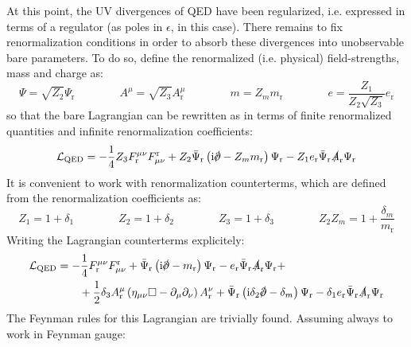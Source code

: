 At this point, the UV divergences of QED have been regularized, i.e. expressed in terms of a regulator (as poles in $ \epsilon $, in this case). There remains to fix renormalization conditions in order to absorb these divergences into unobservable bare parameters.
To do so, define the renormalized (i.e. physical) field-strengths, mass and charge as:
\begin{equation}
  \Psi = \sqrt{Z_2} \Psi_\text{r}
  \qquad \qquad
  A^\mu = \sqrt{Z_3} A^\mu_\text{r}
  \qquad \qquad
  m = Z_m m_\text{r}
  \qquad \qquad
  e = \frac{Z_1}{Z_2 \sqrt{Z_3}} e_\text{r}
  \label{eq:qed-renormalization}
\end{equation}
so that the bare Lagrangian  can be rewritten as in terms of finite renormalized quantities and infinite renormalization coefficients:
\begin{equation}
  \lag_\text{QED} = - \frac{1}{4} Z_3 F^{\mu \nu}_\text{r} F^\text{r}_{\mu \nu} + Z_2 \bar{\Psi}_\text{r} \left( \img \slashed{\pa} - Z_m m_\text{r} \right) \Psi_\text{r} - Z_1 e_\text{r} \bar{\Psi}_\text{r} \slashed{A}_\text{r} \Psi_\text{r}
\end{equation}
It is convenient to work with renormalization counterterms, which are defined from the renormalization coefficients as:
\begin{equation}
  Z_1 = 1 + \delta_1
  \qquad \qquad
  Z_2 = 1 + \delta_2
  \qquad \qquad
  Z_3 = 1 + \delta_3
  \qquad \qquad
  Z_2 Z_m = 1 + \frac{\delta_m}{m_\text{r}}
  \label{eq:qed-counterterms}
\end{equation}
Writing the Lagrangian counterterms explicitely:
\begin{equation}
  \begin{split}
    \lag_\text{QED}
    & = - \frac{1}{4} F^{\mu \nu}_\text{r} F^\text{r}_{\mu \nu} + \bar{\Psi}_\text{r} \left( \img \slashed{\pa} - m_\text{r} \right) \Psi_\text{r} - e_\text{r} \bar{\Psi}_\text{r} \slashed{A}_\text{r} \Psi_\text{r} + \\
    & \qquad + \frac{1}{2} \delta_3 A^\mu_\text{r} \left( \eta_{\mu \nu} \Box - \pa_\mu \pa_\nu \right) A^\nu_\text{r} + \bar{\Psi}_\text{r} \left( \img \delta_2 \slashed{\pa} - \delta_m \right) \Psi_\text{r} - \delta_1 e_\text{r} \bar{\Psi}_\text{r} \slashed{A}_\text{r} \Psi_\text{r}
  \end{split}
\end{equation}
The Feynman rules for this Lagrangian are trivially found. Assuming always to work in Feynman gauge:
